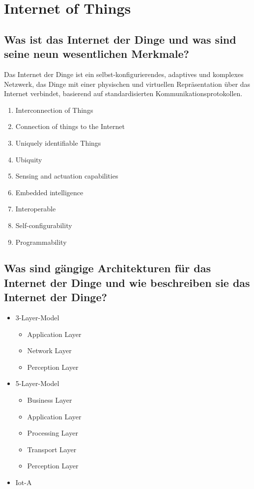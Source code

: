 \documentclass{article}
\begin{document}
\section{Internet of Things}
\subsection{Was ist das Internet der Dinge und was sind seine neun wesentlichen Merkmale?}
Das Internet der Dinge ist ein selbst-konfigurierendes, adaptives und komplexes Netzwerk, das Dinge mit einer physischen und virtuellen Repräsentation über das Internet verbindet, basierend auf standardisierten Kommunikationsprotokollen.
\begin{enumerate}
    \item Interconnection of Things
    \item Connection of things to the Internet
    \item Uniquely identifiable Things
    \item Ubiquity
    \item Sensing and actuation capabilities
    \item Embedded intelligence
    \item Interoperable
    \item Self-configurability
    \item Programmability
\end{enumerate}
\subsection{Was sind gängige Architekturen für das Internet der Dinge und wie beschreiben sie das Internet der Dinge?}
\begin{itemize}
    \item 3-Layer-Model
    \begin{itemize}
        \item Application Layer
        \item Network Layer
        \item Perception Layer
    \end{itemize}
    \item 5-Layer-Model
    \begin{itemize}
        \item Business Layer
        \item Application Layer
        \item Processing Layer
        \item Transport Layer
        \item Perception Layer
    \end{itemize}
    \item Iot-A
\end{itemize}
\end{document}
